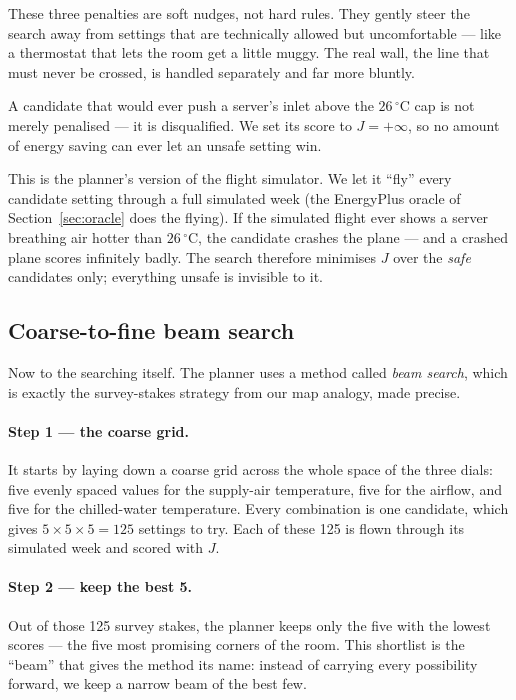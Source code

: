 These three penalties are soft nudges, not hard rules. They gently steer the search away from settings that are technically allowed but uncomfortable --- like a thermostat that lets the room get a little muggy. The real wall, the line that must never be crossed, is handled separately and far more bluntly.

\begin{keyidea}
A candidate that would ever push a server's inlet above the $26\,^\circ$C cap is not merely penalised --- it is disqualified. We set its score to $J = +\infty$, so no amount of energy saving can ever let an unsafe setting win.
\end{keyidea}

This is the planner's version of the flight simulator. We let it ``fly'' every candidate setting through a full simulated week (the EnergyPlus oracle of Section~\ref{sec:oracle} does the flying). If the simulated flight ever shows a server breathing air hotter than $26\,^\circ$C, the candidate crashes the plane --- and a crashed plane scores infinitely badly. The search therefore minimises $J$ over the \emph{safe} candidates only; everything unsafe is invisible to it.

\subsection{Coarse-to-fine beam search}

Now to the searching itself. The planner uses a method called \emph{beam search}, which is exactly the survey-stakes strategy from our map analogy, made precise.

\paragraph{Step 1 --- the coarse grid.} It starts by laying down a coarse grid across the whole space of the three dials: five evenly spaced values for the supply-air temperature, five for the airflow, and five for the chilled-water temperature. Every combination is one candidate, which gives $5 \times 5 \times 5 = 125$ settings to try. Each of these 125 is flown through its simulated week and scored with $J$.

\paragraph{Step 2 --- keep the best 5.} Out of those 125 survey stakes, the planner keeps only the five with the lowest scores --- the five most promising corners of the room. This shortlist is the ``beam'' that gives the method its name: instead of carrying every possibility forward, we keep a narrow beam of the best few.

